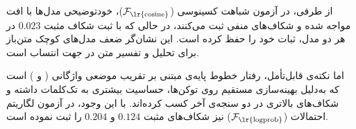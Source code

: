 از طرفی، در آزمون شباهت کسینوسی ($\mathcal{F}_{\text{\lr{cosine}}}$)، خودتوضیحی مدل‌ها با افت مواجه شده و شکاف‌های منفی ثبت می‌کنند، در حالی که  با ثبت شکاف مثبت $0.023$ در هر دو مدل، ثبات خود را حفظ کرده است. این نشان‌گر ضعف مدل‌های کوچک متن‌باز برای تحلیل و تفسیر متن در جهت انتساب است.

اما نکته‌ی قابل‌تأمل، رفتار خطوط پایه‌ی مبتنی بر تقریب موضعی واژگانی ( و ) است که به‌دلیل بهینه‌سازی مستقیم روی توکن‌ها، حساسیت بیشتری به تک‌کلمات داشته و شکاف‌های بالاتری در دو سنجه‌ی آخر کسب کرده‌اند. با این وجود،  در آزمون لگاریتم احتمالات ($\mathcal{F}_{\text{\lr{logprob}}}$) نیز شکاف‌های مثبت $0.124$ و $0.204$ را ثبت نموده است.

\begin{table}[!ht]
    \centering
    \caption{نتایج وفاداری تجربی بر روی مجموعه‌داده‌ی  (جعبه‌سفید)}\label{tab:chap5_wikibio_faithfulness_whitebox}
    \scriptsize
    \linespread{1}\selectfont
    \setlength{\tabcolsep}{3.6pt}
    \renewcommand{\arraystretch}{1.5}
    \setlength{\aboverulesep}{0pt}
    \setlength{\belowrulesep}{0pt}


\end{table}
